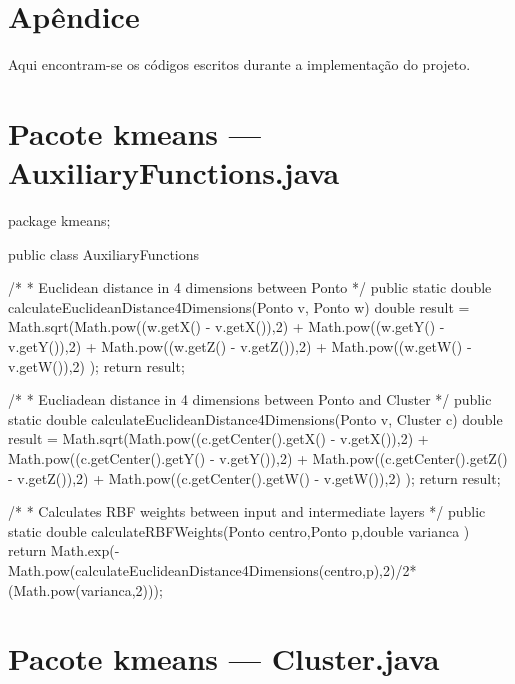 \documentclass[10pt,twocolumn,letterpaper]{article}
\begin{document}
{\small


}

\newpage
\onecolumn
   
\section*{Apêndice}
Aqui encontram-se os códigos escritos durante a implementação do projeto.
\section*{Pacote kmeans --- AuxiliaryFunctions.java}

\begin{spverbatim}
package kmeans;

public class AuxiliaryFunctions {
	
	/*
	 * Euclidean distance in 4 dimensions between Ponto
	 */
	public static double calculateEuclideanDistance4Dimensions(Ponto v, Ponto w){
		double result = Math.sqrt(Math.pow((w.getX() - v.getX()),2) + Math.pow((w.getY() - v.getY()),2) +
						Math.pow((w.getZ() - v.getZ()),2) + Math.pow((w.getW() - v.getW()),2) );
		return result;
	}
	
	/*
	 * Eucliadean distance in 4 dimensions between Ponto and Cluster
	 */
	public static double calculateEuclideanDistance4Dimensions(Ponto v, Cluster c){
		double result = Math.sqrt(Math.pow((c.getCenter().getX() - v.getX()),2) + Math.pow((c.getCenter().getY() - v.getY()),2) +
						Math.pow((c.getCenter().getZ() - v.getZ()),2) + Math.pow((c.getCenter().getW() - v.getW()),2) );
		return result;
	}
	
	/*
	 * Calculates RBF weights between input and intermediate layers
	 */
	public static double calculateRBFWeights(Ponto centro,Ponto p,double varianca ){
		return Math.exp(-Math.pow(calculateEuclideanDistance4Dimensions(centro,p),2)/2* (Math.pow(varianca,2)));
	}
}

\end{spverbatim}

\newpage
\section*{Pacote kmeans --- Cluster.java}
\end{document}
